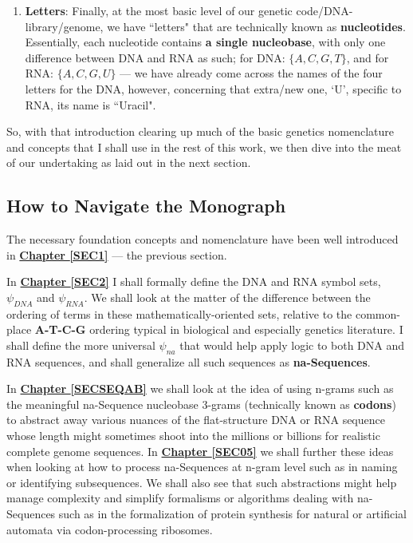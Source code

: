 \documentclass[a4paper, 18pt]{book} %
\begin{document}
\begin{enumerate}
\item \textbf{Letters}: Finally, at the most basic level of our genetic code/DNA-library/genome, we have ``letters" that are technically known as \textbf{nucleotides}. Essentially, each nucleotide contains \textbf{a single nucleobase}, with only one difference between DNA and RNA as such; for DNA: $\{A, C, G, T\}$, and for RNA: $\{A, C, G, U\}$ --- we have already come across the names of the four letters for the DNA, however, concerning that extra/new one, `U', specific to RNA, its name is ``Uracil".
\end{enumerate}


So, with that introduction clearing up much of the basic genetics nomenclature and concepts that I shall use in the rest of this work, we then dive into the meat of our undertaking as laid out in the next section.

\subsection{How to Navigate the Monograph}

The necessary foundation concepts and nomenclature have been well introduced in \textbf{\hyperref[SEC1]{Chapter \ref{SEC1}}} --- the previous section.

In \textbf{\hyperref[SEC2]{Chapter \ref{SEC2}}} I shall formally define the DNA and RNA symbol sets, $\psi_{DNA}$ and $\psi_{RNA}$. We shall look at the matter of the difference between the ordering of terms in these mathematically-oriented sets, relative to the common-place \textbf{A-T-C-G} ordering typical in biological and especially genetics literature. I shall define the more universal $\psi_{na}$ that would help apply logic to both DNA and RNA sequences, and shall generalize all such sequences as \textbf{na-Sequences}.

In \textbf{\hyperref[SECSEQAB]{Chapter \ref{SECSEQAB}}} we shall look at the idea of using n-grams such as the meaningful na-Sequence nucleobase 3-grams (technically known as \textbf{codons}) to abstract away various nuances of the flat-structure DNA or RNA sequence whose length might sometimes shoot into the millions or billions for realistic complete genome sequences. In \textbf{\hyperref[SEC05]{Chapter \ref{SEC05}}} we shall further these ideas when looking at how to process na-Sequences at n-gram level such as in naming or identifying subsequences. We shall also see that such abstractions might help manage complexity and simplify formalisms or algorithms dealing with na-Sequences such as in the formalization of protein synthesis for natural or artificial automata via codon-processing ribosomes.
\end{document}
